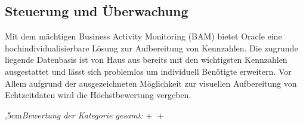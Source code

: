 
\subsection{Steuerung und Überwachung}

Mit dem mächtigen Business Activity Monitoring (BAM) bietet Oracle eine hochindividualisierbare Lösung zur Aufbereitung von Kennzahlen. Die zugrunde liegende Datenbasis ist von Haus aus bereits mit den wichtigsten Kennzahlen ausgestattet und lässt sich problemlos um individuell Benötigte erweitern. 
Vor Allem aufgrund der ausgezeichneten Möglichkeit zur visuellen Aufbereitung von Echtzeitdaten wird die Höchstbewertung vergeben.

\bigskip{},5cm\textit{Bewertung der Kategorie gesamt:} \hspace{5mm} \textcircled{+} \textcircled{+}
\leftskip=0cm

